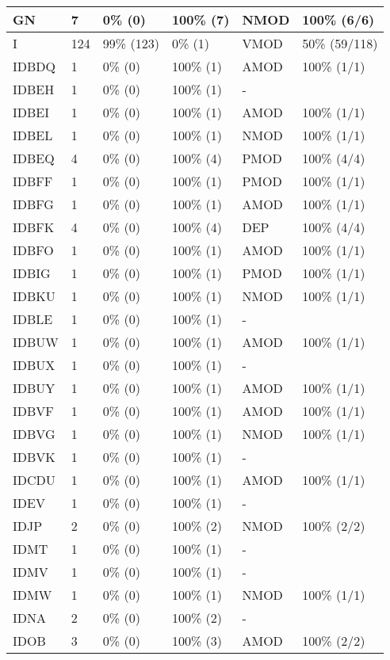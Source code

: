 \begin{figure*}
\begin{tabular}{|l|l|l|l||l|l|}
\hline
 GN & 7 & 0\% (0) & 100\% (7) & NMOD & 100\% (6/6) \\ 
\hline
 I & 124 & 99\% (123) & 0\% (1) & VMOD & 50\% (59/118) \\ 
\hline
 IDBDQ & 1 & 0\% (0) & 100\% (1) & AMOD & 100\% (1/1) \\ 
\hline
 IDBEH & 1 & 0\% (0) & 100\% (1) & - &  \\ 
\hline
 IDBEI & 1 & 0\% (0) & 100\% (1) & AMOD & 100\% (1/1) \\ 
\hline
 IDBEL & 1 & 0\% (0) & 100\% (1) & NMOD & 100\% (1/1) \\ 
\hline
 IDBEQ & 4 & 0\% (0) & 100\% (4) & PMOD & 100\% (4/4) \\ 
\hline
 IDBFF & 1 & 0\% (0) & 100\% (1) & PMOD & 100\% (1/1) \\ 
\hline
 IDBFG & 1 & 0\% (0) & 100\% (1) & AMOD & 100\% (1/1) \\ 
\hline
 IDBFK & 4 & 0\% (0) & 100\% (4) & DEP & 100\% (4/4) \\ 
\hline
 IDBFO & 1 & 0\% (0) & 100\% (1) & AMOD & 100\% (1/1) \\ 
\hline
 IDBIG & 1 & 0\% (0) & 100\% (1) & PMOD & 100\% (1/1) \\ 
\hline
 IDBKU & 1 & 0\% (0) & 100\% (1) & NMOD & 100\% (1/1) \\ 
\hline
 IDBLE & 1 & 0\% (0) & 100\% (1) & - &  \\ 
\hline
 IDBUW & 1 & 0\% (0) & 100\% (1) & AMOD & 100\% (1/1) \\ 
\hline
 IDBUX & 1 & 0\% (0) & 100\% (1) & - &  \\ 
\hline
 IDBUY & 1 & 0\% (0) & 100\% (1) & AMOD & 100\% (1/1) \\ 
\hline
 IDBVF & 1 & 0\% (0) & 100\% (1) & AMOD & 100\% (1/1) \\ 
\hline
 IDBVG & 1 & 0\% (0) & 100\% (1) & NMOD & 100\% (1/1) \\ 
\hline
 IDBVK & 1 & 0\% (0) & 100\% (1) & - &  \\ 
\hline
 IDCDU & 1 & 0\% (0) & 100\% (1) & AMOD & 100\% (1/1) \\ 
\hline
 IDEV & 1 & 0\% (0) & 100\% (1) & - &  \\ 
\hline
 IDJP & 2 & 0\% (0) & 100\% (2) & NMOD & 100\% (2/2) \\ 
\hline
 IDMT & 1 & 0\% (0) & 100\% (1) & - &  \\ 
\hline
 IDMV & 1 & 0\% (0) & 100\% (1) & - &  \\ 
\hline
 IDMW & 1 & 0\% (0) & 100\% (1) & NMOD & 100\% (1/1) \\ 
\hline
 IDNA & 2 & 0\% (0) & 100\% (2) & - &  \\ 
\hline
 IDOB & 3 & 0\% (0) & 100\% (3) & AMOD & 100\% (2/2) \\ 
\hline
\end{tabular}
\end{figure*}
